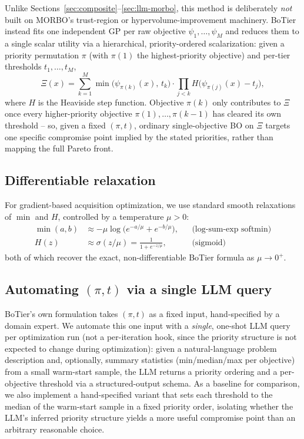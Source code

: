 \documentclass[11pt]{article}
\begin{document}
Unlike Sections~\ref{sec:composite}--\ref{sec:llm-morbo}, this method is
deliberately \emph{not} built on MORBO's trust-region or
hypervolume-improvement machinery. BoTier \citep{botier2025} instead fits
one independent GP per raw objective $\psi_1, \dots, \psi_M$ and reduces
them to a single scalar utility via a hierarchical, priority-ordered
scalarization: given a priority permutation $\pi$ (with $\pi(1)$ the
highest-priority objective) and per-tier thresholds $t_1, \dots, t_M$,
\begin{equation}
  \Xi(x) = \sum_{k=1}^{M} \min\big(\psi_{\pi(k)}(x),\, t_k\big)
    \cdot \prod_{j < k} H\big(\psi_{\pi(j)}(x) - t_j\big),
\end{equation}
where $H$ is the Heaviside step function. Objective $\pi(k)$ only
contributes to $\Xi$ once every higher-priority objective
$\pi(1), \dots, \pi(k-1)$ has cleared its own threshold -- so, given a
fixed $(\pi, t)$, ordinary single-objective BO on $\Xi$ targets one
specific compromise point implied by the stated priorities, rather than
mapping the full Pareto front.

\subsection{Differentiable relaxation}

For gradient-based acquisition optimization, we use standard smooth
relaxations of $\min$ and $H$, controlled by a temperature $\mu > 0$:
\begin{align}
  \min(a,b) &\approx -\mu \log\!\big(e^{-a/\mu} + e^{-b/\mu}\big),
    &&\text{(log-sum-exp softmin)}\\
  H(z) &\approx \sigma(z/\mu) = \frac{1}{1+e^{-z/\mu}}, &&\text{(sigmoid)}
\end{align}
both of which recover the exact, non-differentiable BoTier formula as
$\mu \to 0^+$.

\subsection{Automating $(\pi, t)$ via a single LLM query}

BoTier's own formulation takes $(\pi, t)$ as a fixed input, hand-specified
by a domain expert. We automate this one input with a \emph{single},
one-shot LLM query per optimization run (not a per-iteration hook, since
the priority structure is not expected to change during optimization):
given a natural-language problem description and, optionally, summary
statistics (min/median/max per objective) from a small warm-start sample,
the LLM returns a priority ordering and a per-objective threshold via a
structured-output schema. As a baseline for comparison, we also implement
a hand-specified variant that sets each threshold to the median of the
warm-start sample in a fixed priority order, isolating whether the LLM's
inferred priority structure yields a more useful compromise point than an
arbitrary reasonable choice.
\end{document}
